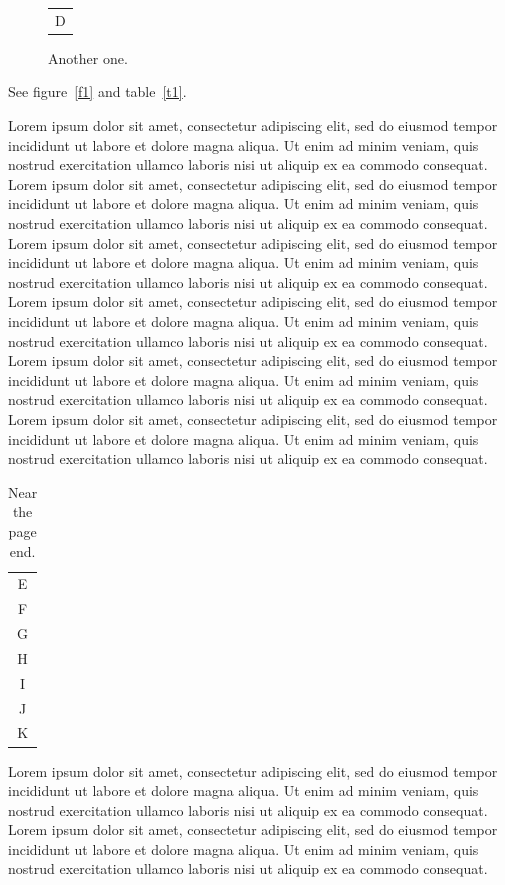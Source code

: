 \documentclass{article}
\begin{document}
\begin{figure}[H]
\centering\begin{tabular}{c}D\end{tabular}
\caption{Another one.}
\end{figure}
See figure~\ref{f1} and table~\ref{t1}.

Lorem ipsum dolor sit amet, consectetur adipiscing elit, sed do eiusmod tempor incididunt ut labore et dolore magna aliqua. Ut enim ad minim veniam, quis nostrud exercitation ullamco laboris nisi ut aliquip ex ea commodo consequat. Lorem ipsum dolor sit amet, consectetur adipiscing elit, sed do eiusmod tempor incididunt ut labore et dolore magna aliqua. Ut enim ad minim veniam, quis nostrud exercitation ullamco laboris nisi ut aliquip ex ea commodo consequat. Lorem ipsum dolor sit amet, consectetur adipiscing elit, sed do eiusmod tempor incididunt ut labore et dolore magna aliqua. Ut enim ad minim veniam, quis nostrud exercitation ullamco laboris nisi ut aliquip ex ea commodo consequat. Lorem ipsum dolor sit amet, consectetur adipiscing elit, sed do eiusmod tempor incididunt ut labore et dolore magna aliqua. Ut enim ad minim veniam, quis nostrud exercitation ullamco laboris nisi ut aliquip ex ea commodo consequat. Lorem ipsum dolor sit amet, consectetur adipiscing elit, sed do eiusmod tempor incididunt ut labore et dolore magna aliqua. Ut enim ad minim veniam, quis nostrud exercitation ullamco laboris nisi ut aliquip ex ea commodo consequat. Lorem ipsum dolor sit amet, consectetur adipiscing elit, sed do eiusmod tempor incididunt ut labore et dolore magna aliqua. Ut enim ad minim veniam, quis nostrud exercitation ullamco laboris nisi ut aliquip ex ea commodo consequat.
\begin{table}[H]\centering\begin{tabular}{c}E\\F\\G\\H\\I\\J\\K\end{tabular}\caption{Near the page end.}\end{table}
Lorem ipsum dolor sit amet, consectetur adipiscing elit, sed do eiusmod tempor incididunt ut labore et dolore magna aliqua. Ut enim ad minim veniam, quis nostrud exercitation ullamco laboris nisi ut aliquip ex ea commodo consequat. Lorem ipsum dolor sit amet, consectetur adipiscing elit, sed do eiusmod tempor incididunt ut labore et dolore magna aliqua. Ut enim ad minim veniam, quis nostrud exercitation ullamco laboris nisi ut aliquip ex ea commodo consequat.
\end{document}
